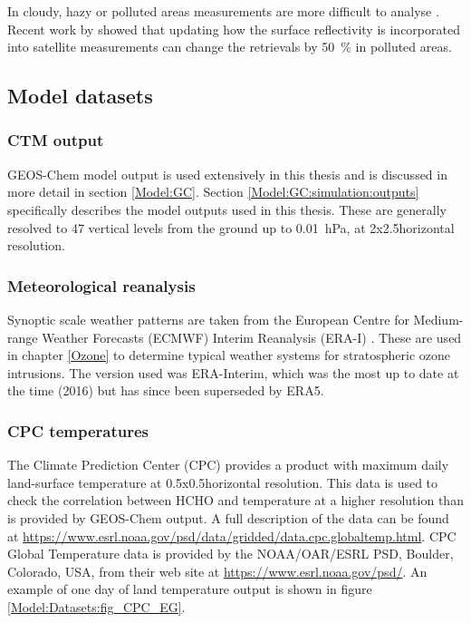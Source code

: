       In cloudy, hazy or polluted areas measurements are more difficult to analyse \parencite[e.g.][]{Palmer2003,Marais2014}.
      Recent work by \textcite{Vasilkov2017} showed that updating how the surface reflectivity is incorporated into satellite measurements can change the retrievals by 50~\% in polluted areas.
      
      
  \subsection{Model datasets}
    
    \subsubsection{CTM output}
      
      GEOS-Chem model output is used extensively in this thesis and is discussed in more detail in section \ref{Model:GC}.
      Section \ref{Model:GC:simulation:outputs} specifically describes the model outputs used in this thesis.
      These are generally resolved to 47 vertical levels from the ground up to 0.01~hPa, at 2x2.5\degr horizontal resolution.
    
    \subsubsection{Meteorological reanalysis}
      \label{Model:Datasets:ERAI}
      
      Synoptic scale weather patterns are taken from the European Centre for Medium-range Weather Forecasts (ECMWF) Interim Reanalysis (ERA-I) \parencite{Dee2011}.
      These are used in chapter \ref{Ozone} to determine typical weather systems for stratospheric ozone intrusions.
      The version used was ERA-Interim, which was the most up to date at the time (2016) but has since been superseded by ERA5.
    
    \subsubsection{CPC temperatures}
      The Climate Prediction Center (CPC) provides a product with maximum daily land-surface temperature at 0.5x0.5\degr  horizontal resolution. 
      This data is used to check the correlation between HCHO and temperature at a higher resolution than is provided by GEOS-Chem output.
      A full description of the data can be found at \url{https://www.esrl.noaa.gov/psd/data/gridded/data.cpc.globaltemp.html}.
      CPC Global Temperature data is provided by the NOAA/OAR/ESRL PSD, Boulder, Colorado, USA, from their web site at \url{https://www.esrl.noaa.gov/psd/}.
      An example of one day of land temperature output is shown in figure \ref{Model:Datasets:fig_CPC_EG}.
      
